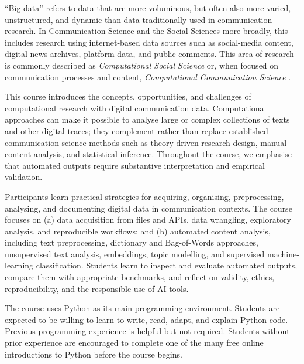 ``Big data'' refers to data that are more voluminous, but often also more varied, unstructured, and dynamic than data traditionally used in communication research. In Communication Science and the Social Sciences more broadly, this includes research using internet-based data sources such as social-media content, digital news archives, platform data, and public comments. This area of research is commonly described as \emph{Computational Social Science} \citep{Lazer2009} or, when focused on communication processes and content, \emph{Computational Communication Science} \citep{Shah2015}.

This course introduces the concepts, opportunities, and challenges of computational research with digital communication data. Computational approaches can make it possible to analyse large or complex collections of texts and other digital traces; they complement rather than replace established communication-science methods such as theory-driven research design, manual content analysis, and statistical inference. Throughout the course, we emphasise that automated outputs require substantive interpretation and empirical validation.

Participants learn practical strategies for acquiring, organising, preprocessing, analysing, and documenting digital data in communication contexts. The course focuses on (a) data acquisition from files and APIs, data wrangling, exploratory analysis, and reproducible workflows; and (b) automated content analysis, including text preprocessing, dictionary and Bag-of-Words approaches, unsupervised text analysis, embeddings, topic modelling, and supervised machine-learning classification. Students learn to inspect and evaluate automated outputs, compare them with appropriate benchmarks, and reflect on validity, ethics, reproducibility, and the responsible use of AI tools.

The course uses Python as its main programming environment. Students are expected to be willing to learn to write, read, adapt, and explain Python code. Previous programming experience is helpful but not required. Students without prior experience are encouraged to complete one of the many free online introductions to Python before the course begins.
